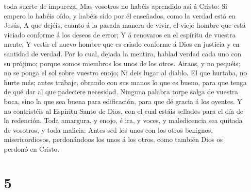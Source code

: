toda suerte de impureza.  Mas vosotros no habéis
aprendido así á Cristo:  Si empero lo habéis oído, y
habéis sido por él enseñados, como la verdad está en Jesús,
 A que dejéis, cuanto á la pasada manera de vivir, el
viejo hombre que está viciado conforme á los deseos de error;
 Y á renovaros en el espíritu de vuestra mente,
 Y vestir el nuevo hombre que es criado conforme á Dios
en justicia y en santidad de verdad.  Por lo cual, dejada
la mentira, hablad verdad cada uno con su prójimo; porque somos miembros
los unos de los otros.  Airaos, y no pequéis; no se ponga
el sol sobre vuestro enojo;  Ni deis lugar al diablo.
 El que hurtaba, no hurte más; antes trabaje, obrando con
sus manos lo que es bueno, para que tenga de qué dar al que padeciere
necesidad.  Ninguna palabra torpe salga de vuestra boca,
sino la que sea buena para edificación, para que dé gracia á los
oyentes.  Y no contristéis al Espíritu Santo de Dios, con
el cual estáis sellados para el día de la redención. 
Toda amargura, y enojo, é ira, y voces, y maledicencia sea quitada de
vosotros, y toda malicia:  Antes sed los unos con los
otros benignos, misericordiosos, perdonándoos los unos á los otros, como
también Dios os perdonó en Cristo.

\hypertarget{section-4}{%
\section{5}\label{section-4}}

